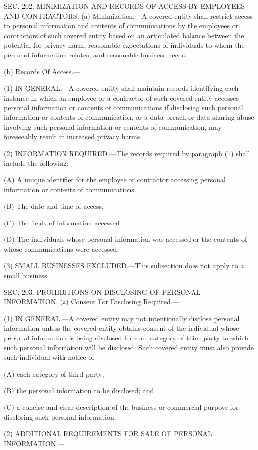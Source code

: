 SEC. 202. MINIMIZATION AND RECORDS OF ACCESS BY EMPLOYEES AND CONTRACTORS.
(a) Minimization.—A covered entity shall restrict access to personal information and contents of communications by the employees or contractors of such covered entity based on an articulated balance between the potential for privacy harm, reasonable expectations of individuals to whom the personal information relates, and reasonable business needs.

(b) Records Of Access.—

(1) IN GENERAL.—A covered entity shall maintain records identifying each instance in which an employee or a contractor of such covered entity accesses personal information or contents of communications if disclosing such personal information or contents of communication, or a data breach or data-sharing abuse involving such personal information or contents of communication, may foreseeably result in increased privacy harms.

(2) INFORMATION REQUIRED.—The records required by paragraph (1) shall include the following:

(A) A unique identifier for the employee or contractor accessing personal information or contents of communications.

(B) The date and time of access.

(C) The fields of information accessed.

(D) The individuals whose personal information was accessed or the contents of whose communications were accessed.

(3) SMALL BUSINESSES EXCLUDED.—This subsection does not apply to a small business.


SEC. 203. PROHIBITIONS ON DISCLOSING OF PERSONAL INFORMATION.
(a) Consent For Disclosing Required.—

(1) IN GENERAL.—A covered entity may not intentionally disclose personal information unless the covered entity obtains consent of the individual whose personal information is being disclosed for each category of third party to which such personal information will be disclosed. Such covered entity must also provide such individual with notice of—

(A) each category of third party;

(B) the personal information to be disclosed; and

(C) a concise and clear description of the business or commercial purpose for disclosing such personal information.

(2) ADDITIONAL REQUIREMENTS FOR SALE OF PERSONAL INFORMATION.—

